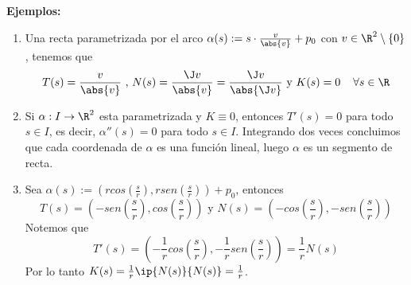 \documentclass{article}
\begin{document}
\noindent\textbf{Ejemplos:}
\begin{enumerate}
    \item Una recta parametrizada por el arco $\alpha(s):=s\cdot \frac{v}{\abs{v}}+p_{0}$ con
    $v\in\R^{2}\setminus\{0\}$, tenemos que
    \begin{equation*}
        T(s)=\frac{v}{\abs{v}}\text{ , }N(s)=\frac{\J v}{\abs{v}}=\frac{\J v}{\abs{\J v}}
        \text{ y }K(s)=0\hspace{4mm}\forall s\in\R
    \end{equation*}

    \item Si $\alpha: I\to\R^{2}$ esta parametrizada y $K\equiv0$, entonces $T'(s)=0$ para todo
    $s\in I$, es decir, $\alpha''(s)=0$ para todo $s\in I$. Integrando dos veces concluimos que
    cada coordenada de $\alpha$ es una función lineal, luego $\alpha$ es un segmento de recta.

    \item Sea 
    $\alpha(s):=\left(rcos\left(\frac{s}{r}\right),rsen\left(\frac{s}{r}\right)\right)+p_{0}$,
    entonces
    \begin{equation*}
        T(s)=\left(-sen\left(\frac{s}{r}\right),cos\left(\frac{s}{r}\right)\right)\text{ y }
        N(s)=\left(-cos\left(\frac{s}{r}\right),-sen\left(\frac{s}{r}\right)\right)
    \end{equation*}
    Notemos que
    \begin{equation*}
        T'(s)=\left(-\frac{1}{r}cos\left(\frac{s}{r}\right),-\frac{1}{r}sen\left(
        \frac{s}{r}\right)\right)=\frac{1}{r}N(s)
    \end{equation*}
    Por lo tanto $K(s)=\frac{1}{r}\ip{N(s)}{N(s)}=\frac{1}{r}$.
\end{enumerate}
\end{document}
